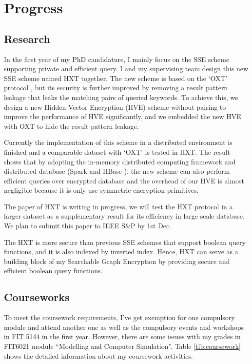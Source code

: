 \chapter{Progress}
\section{Research}
In the first year of my PhD candidature, I mainly focus on the SSE scheme supporting private and efficient query. I and my supervising team design this new SSE scheme named HXT together. The new scheme is based on the `OXT' protocol \cite{cash2013highly}, but its security is further improved by removing a result pattern leakage that leaks the matching pairs of queried keywords. To achieve this, we design a new Hidden Vector Encryption (HVE) scheme without pairing to improve the performance of HVE significantly, and we embedded the new HVE with OXT to hide the result pattern leakage.

Currently the implementation of this scheme in a distributed environment is finished and a comparable dataset with `OXT' is tested in HXT. The result shows that by adopting the in-memory distributed computing framework and distributed database (Spark \cite{apache2017spark} and HBase \cite{apache2017hbase}), the new scheme can also perform efficient queries over encrypted database and the overhead of our HVE is almost negligible because it is only use symmetric encryption primitives. 

The paper of HXT is writing in progress, we will test the HXT protocol in a larger dataset as a supplementary result for its efficiency in large scale database. We plan to submit this paper to IEEE S\&P by 1st Dec.

The HXT is more secure than previous SSE schemes that support boolean query functions, and it is also indexed by inverted index. Hence, HXT can serve as a building block of my Searchable Graph Encryption by providing secure and efficient boolean query functions.

\section{Courseworks}
To meet the coursework requirements, I've get exemption for one compulsory module and attend another one as well as the compulsory events and workshops in FIT 5144 in the first year. However, there are some issues with my grades in FIT6021 module ``Modelling and Computer Simulation''. Table \ref{tlb:coursework} shows the detailed information about my coursework activities. 

